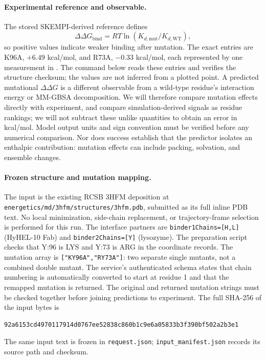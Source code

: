 \paragraph{Experimental reference and observable.}
The stored SKEMPI-derived reference defines
\begin{equation}
\Delta\Delta G_{\mathrm{bind}}
=RT\ln\!\left(K_{d,\mathrm{mut}}/K_{d,\mathrm{WT}}\right),
\end{equation}
so positive values indicate weaker binding after mutation. The exact entries are K96A,
$+6.49$ kcal/mol, and R73A, $-0.33$ kcal/mol, each represented by one measurement in
. The command below reads these entries and verifies
the structure checksum; the values are not inferred from a plotted point.
A predicted mutational $\Delta\Delta G$ is a different observable from a wild-type residue's
interaction energy or MM-GBSA decomposition. We will therefore compare mutation effects directly
with experiment, and compare simulation-derived signals as residue rankings; we will not subtract
these unlike quantities to obtain an error in kcal/mol. Model output units and sign convention
must be verified before any numerical comparison. Nor does success establish that the predictor
isolates an enthalpic contribution: mutation effects can include packing, solvation, and ensemble
changes.

\paragraph{Frozen structure and mutation mapping.}
The input is the existing RCSB 3HFM deposition at
\texttt{energetics/md/3hfm/structures/3hfm.pdb}, submitted as its full inline PDB text.
No local minimization, side-chain replacement, or trajectory-frame selection is performed for this
run. The interface partners are \texttt{binder1Chains=[H,L]} (HyHEL-10 Fab) and
\texttt{binder2Chains=[Y]} (lysozyme). The preparation script checks that Y:96 is LYS and
Y:73 is ARG in the coordinate records. The mutation array is
\texttt{["KY96A","RY73A"]}: two separate single mutants, not a combined double mutant.
The service's authenticated schema states that chain numbering is automatically converted to
start at residue 1 and that the remapped mutation is returned. The original and returned mutation
strings must be checked together before joining predictions to experiment.
The full SHA-256 of the input bytes is
\begin{verbatim}
92a6153cd4970117914d0767ee52838c860b1c9e6a05833b3f390bf502a2b3e1
\end{verbatim}
The same input text is frozen in \texttt{request.json}; \texttt{input\_manifest.json} records
its source path and checksum.

